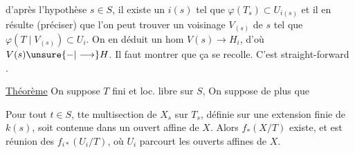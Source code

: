 
d'après l'hypothèse   $s\in S$, il existe un $i(s)$ tel que $\varphi(T_s)\subset U_{i(s)}$ et il en résulte (préciser) que l'on peut trouver un voisinage  $V_{(s)}$ de $s$ tel que $\varphi(T\mid V_{(s)})\subset U_i$. On en déduit un hom $V(s)\longrightarrow H_i$, d'où $V(s)\unsure{-|\longrightarrow} H$. Il faut montrer que ça se recolle. C'est straight-forward \unsure{\ldots}.

\uline{Théorème} On suppose $T$ fini et loc. libre sur $S$,  On suppose de plus que 


Pour tout $t\in S$, tte multisection de $X_s$ sur $T_s$, définie sur une extension finie de $k(s)$, soit contenue dans un ouvert affine de $X$. Alors  \deleted{[condition tjrs remplie si tte partie} $f_*(X/T)$ existe, et est réunion des $f_{i*}(U_i/T)$, où $U_i$ parcourt les ouverts affines de $X$.

